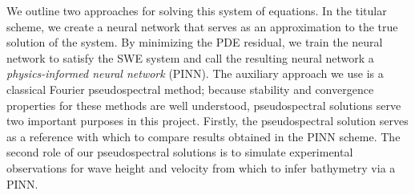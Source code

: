 We outline two approaches for solving this system of equations. In the titular scheme, we create a neural network that 
serves as an approximation to the true solution of the system. By minimizing the PDE residual, we train the neural 
network to satisfy the SWE system and call the resulting neural network a \textit{physics-informed neural network} 
(PINN). The auxiliary approach we use is a classical Fourier pseudospectral method; because 
stability and convergence properties for these methods are well understood, pseudospectral solutions serve two important
purposes in this project. Firstly, the pseudospectral solution serves as a reference with which to compare results
obtained in the PINN scheme. The second role of our pseudospectral solutions is to simulate experimental observations 
for wave height and velocity from which to infer bathymetry via a PINN. 
